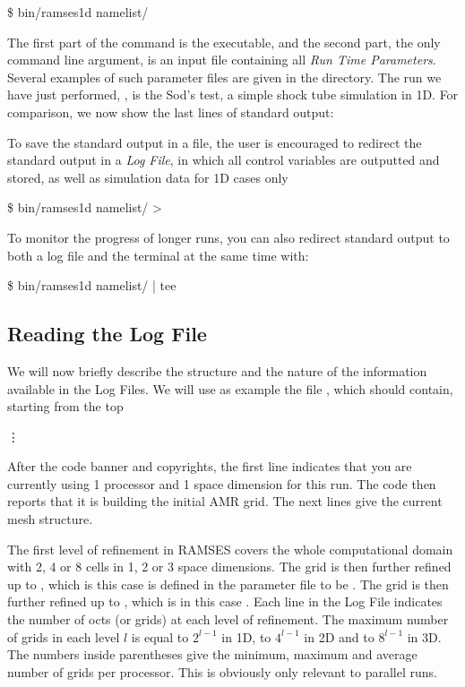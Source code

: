 \begin{Prompt}
\$ bin/ramses1d namelist/{\nmlfilename}
\end{Prompt}

The first part of the command is the executable, and the second part, the only
command line argument, is an input file containing all \emph{Run Time
Parameters}. Several examples of such parameter files are given in the
 directory. The run we have just performed, \cmd{\nmlfilename},
is the Sod's test, a simple shock tube simulation in 1D. For comparison, we now
show the last {\lastlinescount} lines of standard output:


To save the standard output in a file, the user is encouraged to
redirect the standard output in a \emph{Log File}, in which all
control variables are outputted and stored, as well as simulation data
for 1D cases only

\begin{Prompt}
\$ bin/ramses1d namelist/{\nmlfilename} > {\logfilename}
\end{Prompt}
%
To monitor the progress of longer runs, you can also redirect standard output
to both a log file and the terminal at the same time with:
%
\begin{Prompt}
\$ bin/ramses1d namelist/{\nmlfilename} | tee {\logfilename}
\end{Prompt}

\clearpage %
\subsection{Reading the Log File}
We will now briefly describe the structure and the nature of the
information available in the Log Files. We will use as example the file
\cmd{\logfilename}, which should contain, starting from the top

%
\hskip 2cm \vdots
%

After the code banner and copyrights, the first line indicates that you are
currently using 1 processor and 1 space dimension for this run. The code then
reports that it is building the initial AMR grid. The next lines give the
current mesh structure.

The first level of refinement in RAMSES covers the whole computational domain
with 2, 4 or 8 cells in 1, 2 or 3 space dimensions. The grid is then further
refined up to , which is this case is defined in the
parameter file to be .  The grid is then further
refined up to , which is in this case
. Each line in the Log File indicates the number
of octs (or grids) at each level of refinement. The maximum number of grids in
each level $l$ is equal to $2^{l-1}$ in 1D, to $4^{l-1}$ in 2D and to $8^{l-1}$
in 3D. The numbers inside parentheses give the minimum, maximum and average
number of grids per processor. This is obviously only relevant to parallel
runs.

